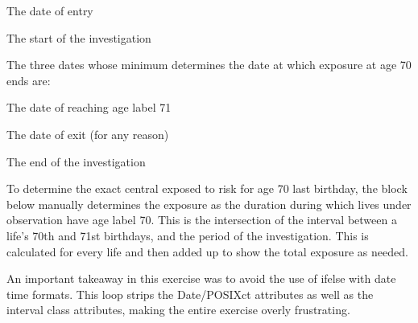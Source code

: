 \documentclass[
]{article}
\begin{document}
\item

The date of entry

\item

The start of the investigation

The three dates whose minimum determines the date at which exposure at
age 70 ends are:

\item

The date of reaching age label 71

\item

The date of exit (for any reason)

\item

The end of the investigation

To determine the exact central exposed to risk for age 70 last birthday,
the block below manually determines the exposure as the duration during
which lives under observation have age label 70. This is the
intersection of the interval between a life's 70th and 71st birthdays,
and the period of the investigation. This is calculated for every life
and then added up to show the total exposure as needed.

An important takeaway in this exercise was to avoid the use of ifelse
with date time formats. This loop strips the Date/POSIXct attributes as
well as the interval class attributes, making the entire exercise overly
frustrating.
\end{document}
